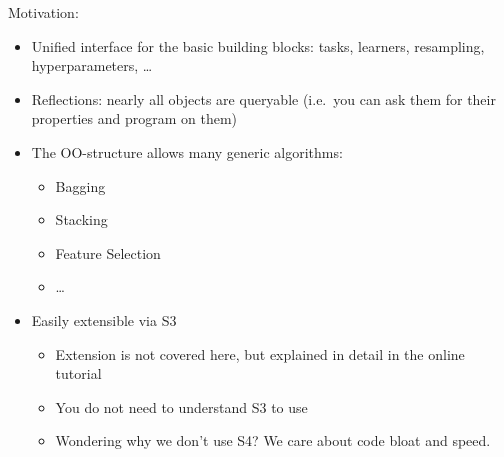 \begin{vframe}{Motivation: }
  \begin{itemize}
    \item Unified interface for the basic building blocks: tasks, learners, resampling, hyperparameters, \ldots
    \item Reflections: nearly all objects are queryable (i.e.\ you can ask them for their properties and program on them)
    \item The OO-structure allows many generic algorithms:
      \begin{itemize}
        \item Bagging
        \item Stacking
        \item Feature Selection
        \item \ldots
      \end{itemize}
    \item Easily extensible via S3
      \begin{itemize}
        \item Extension is not covered here, but explained in detail in the online tutorial
        \item You do not need to understand S3 to use 
        \item Wondering why we don't use S4? We care about code bloat and speed.
      \end{itemize}
  \end{itemize}
\end{vframe}

\begin{vframe}{}
\begin{knitrout}
\color{fgcolor}\begin{kframe}


{\ttfamily\noindent\bfseries{}}\end{kframe}
\end{knitrout}

\end{vframe}









